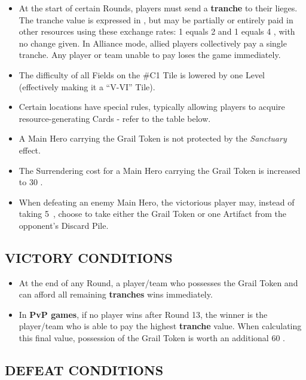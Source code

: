 \begin{multicols}{2}
\begin{itemize}
  \item At the start of certain Rounds, players must send a \textbf{tranche} to their lieges. The tranche value is expressed in , but may be partially or entirely paid in other resources using these exchange rates: 1  equals 2  and 1  equals 4 , with no change given. In Alliance mode, allied players collectively pay a single tranche. Any player or team unable to pay loses the game immediately.
  \item The difficulty of all Fields on the \#C1 Tile is lowered by one Level (effectively making it a ``V-VI'' Tile).
  \item Certain locations have special rules, typically allowing players to acquire resource-generating Cards - refer to the table below.
  \item A Main Hero carrying the Grail Token is not protected by the \textit{Sanctuary} effect.
  \item The Surrendering cost for a Main Hero carrying the Grail Token is increased to 30 .
  \item When defeating an enemy Main Hero, the victorious player may, instead of taking \mbox{5 }, choose to take either the Grail Token or one Artifact from the opponent's Discard Pile.
\end{itemize}

\subsection*{\MakeUppercase{Victory Conditions}}

\begin{itemize}
  \item At the end of any Round, a player/team who possesses the Grail Token and can afford all remaining \textbf{tranches} wins immediately.
  \item In \textbf{PvP games}, if no player wins after Round 13, the winner is the player/team who is able to pay the highest \textbf{tranche} value. When calculating this final value, possession of the Grail Token is worth an additional 60 .
\end{itemize}

\subsection*{\MakeUppercase{Defeat Conditions}}


\end{multicols}

